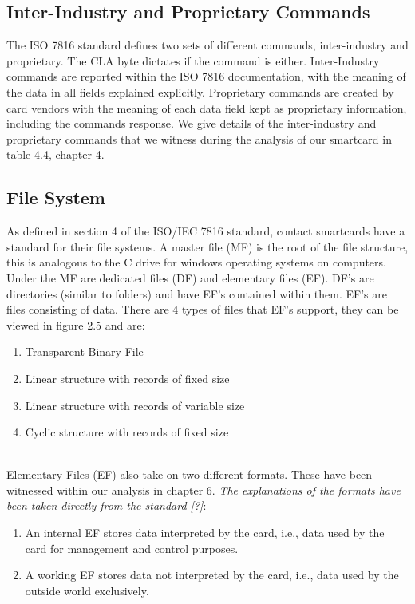 \documentclass[bsc,frontabs,twoside,singlespacing,parskip,deptreport]{infthesis}     %
\begin{document}
\subsection{Inter-Industry and Proprietary Commands}
The ISO 7816 standard defines two sets of different commands, inter-industry and proprietary. The CLA byte dictates if the command is either. Inter-Industry commands are reported within the ISO 7816 documentation, with the meaning of the data in all fields explained explicitly. Proprietary commands are created by card vendors with the meaning of each data field kept as proprietary information, including the commands response. We give details of the inter-industry and proprietary commands that we witness during the analysis of our smartcard in table 4.4, chapter 4.

\subsection{File System}

As defined in section 4 of the ISO/IEC 7816 standard, contact smartcards have a standard for their file systems. A master file (MF) is the root of the file structure, this is analogous to the C drive for windows operating systems on computers. Under the MF are dedicated files (DF) and elementary files (EF). DF's are directories (similar to folders) and have EF's contained within them. EF's are files consisting of data. There are 4 types of files that EF's support, they can be viewed in figure 2.5 and are:
\begin{enumerate}
\item Transparent Binary File
\item Linear structure with records of fixed size
\item Linear structure with records of variable size
\item Cyclic structure with records of fixed size\\\\
\end{enumerate}

Elementary Files (EF) also take on two different formats. These have been witnessed within our analysis in chapter 6. \textit{The explanations of the formats have been taken directly from the standard [?]}:
\begin{enumerate}
\item An internal EF stores data interpreted by the card, i.e., data used by the card for management and
control purposes.
\item A working EF stores data not interpreted by the card, i.e., data used by the outside world exclusively.
\end{enumerate}
\end{document}
